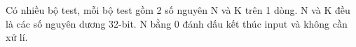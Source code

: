 Có nhiều bộ test, mỗi bộ test gồm 2 số nguyên N và K trên 1 dòng. N và K đều là các số nguyên dương 32-bit. N bằng 0 đánh dấu kết thúc input và không cần xử lí.